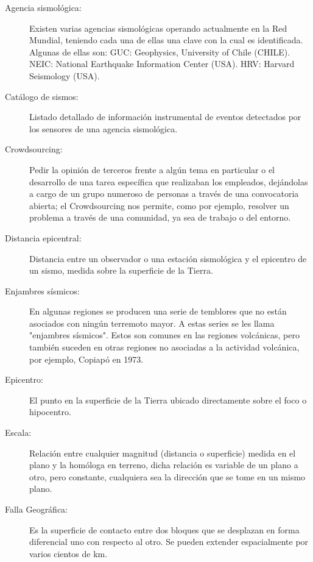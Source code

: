 \begin{description}
\item[Agencia sismológica:] Existen varias agencias sismológicas operando actualmente en la Red Mundial, teniendo cada una de ellas una clave con la cual es identificada. Algunas de ellas son: GUC: Geophysics, University of Chile (CHILE). NEIC: National Earthquake Information Center (USA). HRV: Harvard Seismology (USA).\cite{csnglosary}

\item[Catálogo de sismos:] Listado detallado de información instrumental de eventos detectados por los sensores de una agencia sismológica.\cite{csnglosary}

\item[Crowdsourcing:] Pedir la opinión de terceros frente a algún tema en particular o el desarrollo de una tarea específica que realizaban los empleados, dejándolas a cargo de un grupo numeroso de personas a través de una convocatoria abierta; el Crowdsourcing nos permite, como por ejemplo, resolver un problema a través de una comunidad, ya sea de trabajo o del entorno.\cite{crowddefinicion}

\item[Distancia epicentral:] Distancia entre un observador o una estación sismológica y el epicentro de un sismo, medida sobre la superficie de la Tierra.\cite{csnglosary}

\item[Enjambres sísmicos:] En algunas regiones se producen una serie de temblores que no están asociados con ningún terremoto mayor. A estas series se les llama "enjambres sísmicos". Estos son comunes en las regiones volcánicas, pero también suceden en otras regiones no asociadas a la actividad volcánica, por ejemplo, Copiapó en 1973.\cite{csnglosary}

\item[Epicentro:] El punto en la superficie de la Tierra ubicado directamente sobre el foco o hipocentro.\cite{csnglosary}

\item[Escala:] Relación entre cualquier magnitud (distancia o superficie) medida en el plano y la homóloga en terreno, dicha relación es variable de un plano a otro, pero constante, cualquiera sea la dirección que se tome en un mismo plano.\cite{csnglosary}

\item[Falla Geográfica:] Es la superficie de contacto entre dos bloques que se desplazan en forma diferencial uno con respecto al otro. Se pueden extender espacialmente por varios cientos de km.\cite{csnglosary}


\end{description}
